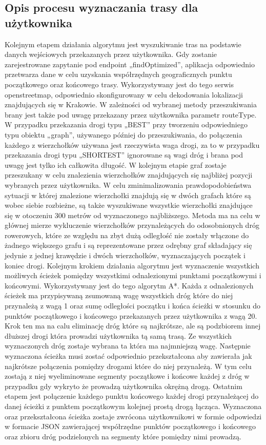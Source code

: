\subsection{Opis procesu wyznaczania trasy dla użytkownika}

Kolejnym etapem działania algorytmu jest wyszukiwanie tras na podstawie danych wejściowych przekazanych przez użytkownika. Gdy zostanie zarejestrowane zapytanie pod endpoint „findOptimized”, aplikacja odpowiednio przetwarza dane w celu uzyskania współrzędnych geograficznych punktu początkowego oraz końcowego trasy. Wykorzystywany jest do tego serwis openstreetmap, odpowiednio skonfigurowany w celu dekodowania lokalizacji znajdujących się w Krakowie. W zależności od wybranej metody przeszukiwania brany jest także pod uwagę przekazany przez użytkownika parametr routeType. W przypadku przekazania drogi typu „BEST” przy tworzeniu odpowiedniego typu obiektu „graph”, używanego później do przeszukiwania, do połączenia każdego z wierzchołków używana jest rzeczywista waga drogi, za to w przypadku przekazania drogi typu „SHORTEST” ignorowane są wagi dróg i brana pod uwagę jest tylko ich całkowita długość.
W kolejnym etapie graf zostaje przeszukany w celu znalezienia wierzchołków znajdujących się najbliżej pozycji wybranych przez użytkownika. W celu zminimalizowania prawdopodobieństwa sytuacji w której znalezione wierzchołki znajdują się w dwóch grafach które są wobec siebie rozbieżne, są także wyszukiwane wszystkie wierzchołki znajdujące się w otoczeniu 300 metrów od wyznaczonego najbliższego. Metoda ma na celu w głównej mierze wykluczenie wierzchołków przynależących do odosobnionych dróg rowerowych, które ze względu na zbyt dużą odległość nie zostały włączone do żadnego większego grafu i są reprezentowane przez odrębny graf składający się jedynie z jednej krawędzie i dwóch wierzchołków, wyznaczających początek i koniec drogi.
Kolejnym krokiem działania algorytmu jest wyznaczenie wszystkich możliwych ścieżek pomiędzy wszystkimi odnalezionymi punktami początkowymi i końcowymi. Wykorzystywany jest do tego algorytm A*. Każda z odnalezionych ścieżek ma przypisywaną zsumowaną wagę wszystkich dróg które do niej przynależą z wagą 1 oraz sumę odległości początku i końca ścieżki w stosunku do punktów początkowego i końcowego przekazanych przez użytkownika z wagą 20. Krok ten ma na calu eliminację dróg które są najkrótsze, ale są podzbiorem innej dłuższej drogi która prowadzi użytkownika tą samą trasą. Ze wszystkich wyznaczonych dróg zostaje wybrana ta która ma najmniejszą wagę.
Następnie wyznaczona ścieżka musi zostać odpowiednio przekształcona aby zawierała jak najkrótsze połączenia pomiędzy drogami które do niej przynależą. W tym celu zostają z niej wyeliminowane segmenty początkowe i końcowe każdej z dróg w przypadku gdy wykryto że prowadzą użytkownika okrężną drogą. Ostatnim etapem jest połączenie każdego punktu końcowego każdej drogi przynależącej do danej ścieżki z punktem początkowym kolejnej prostą drogą łącząca.
Wyznaczona oraz przekształcona ścieżka zostaje zwrócona użytkownikowi w formie odpowiedzi w formacie JSON zawierającej współrzędne punktów początkowego i końcowego oraz zbioru dróg podzielonych na segmenty które pomiędzy nimi prowadzą.

